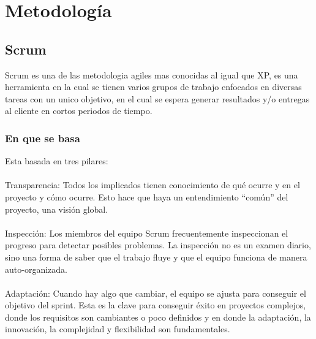 \chapter{Metodología}
\section{Scrum}
Scrum es una de las metodologia agiles mas conocidas al igual que XP, es una herramienta en la cual se tienen varios grupos de trabajo enfocados en diversas tareas con un unico objetivo, en el cual se espera generar resultados y/o entregas al cliente en cortos periodos de tiempo.
\\
\subsection{En que se basa}

Esta basada en tres pilares:
\\
\\
Transparencia: Todos los implicados tienen conocimiento de qué ocurre y en el proyecto y cómo ocurre. Esto hace que haya un entendimiento “común” del proyecto, una visión global.
\\
\\
Inspección: Los miembros del equipo Scrum frecuentemente inspeccionan el progreso para detectar posibles problemas. La inspección no es un examen diario, sino una forma de saber que el trabajo fluye y que el equipo funciona de manera auto-organizada.
\\
\\
Adaptación: Cuando hay algo que cambiar, el equipo se ajusta para conseguir el objetivo del sprint. Esta es la clave para conseguir éxito en proyectos complejos, donde los requisitos son cambiantes o poco definidos y en donde la adaptación, la innovación, la complejidad y flexibilidad son fundamentales.